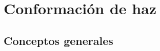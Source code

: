 \chapter{Conformación de haz}\label{ch:beamforming}

\section{Conceptos generales}\label{subc:intro_congen}


